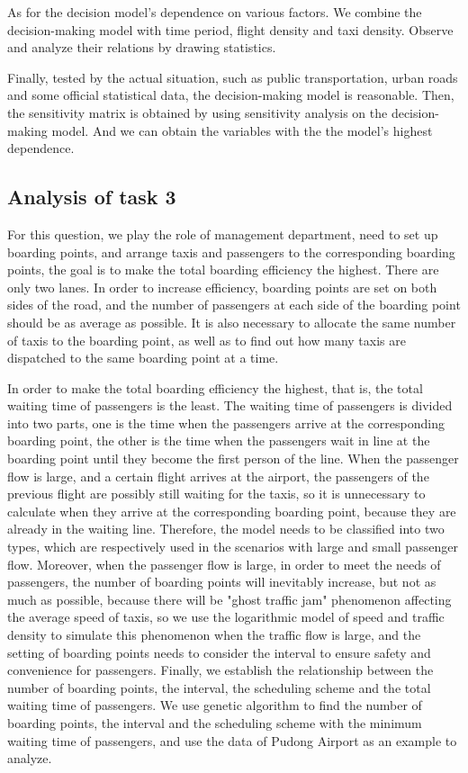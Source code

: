 As for the decision model's dependence on various factors. We combine the decision-making model with time period, flight density and taxi density. Observe and analyze their relations by drawing statistics.

Finally, tested by the actual situation, such as public transportation, urban roads and some official statistical data, the decision-making model is reasonable. Then, the sensitivity matrix is obtained by using sensitivity analysis on the decision-making model. And we can obtain the variables with the the model's highest dependence.

\subsection{Analysis of task 3}

\par For this question, we play the role of management department, need to set up boarding points, and arrange taxis and passengers to the corresponding boarding points, the goal is to make the total boarding efficiency the highest. There are only two lanes. In order to increase efficiency, boarding points are set on both sides of the road, and the number of passengers at each side of the boarding point should be as average as possible. It is also necessary to allocate the same number of taxis to the boarding point, as well as to find out how many taxis are dispatched to the same boarding point at a time.

In order to make the total boarding efficiency the highest, that is, the total waiting time of passengers is the least. The waiting time of passengers is divided into two parts, one is the time when the passengers arrive at the corresponding boarding point, the other is the time when the passengers wait in line at the boarding point until they become the first person of the line. When the passenger flow is large, and a certain flight arrives at the airport, the passengers of the previous flight are possibly still waiting for the taxis, so it is unnecessary to calculate when they arrive at the corresponding boarding point, because they are already in the waiting line. Therefore, the model needs to be classified into two types, which are respectively used in the scenarios with large and small passenger flow. Moreover, when the passenger flow is large, in order to meet the needs of passengers, the number of boarding points will inevitably increase, but not as much as possible, because there will be "ghost traffic jam" phenomenon affecting the average speed of taxis, so we use the logarithmic model of speed and traffic density to simulate this phenomenon when the traffic flow is large, and the setting of boarding points needs to consider the interval to ensure safety and convenience for passengers. Finally, we establish the relationship between the number of boarding points, the interval, the scheduling scheme and the total waiting time of passengers. We use genetic algorithm to find the number of boarding points, the interval and the scheduling scheme with the minimum waiting time of passengers, and use the data of Pudong Airport as an example to analyze.

